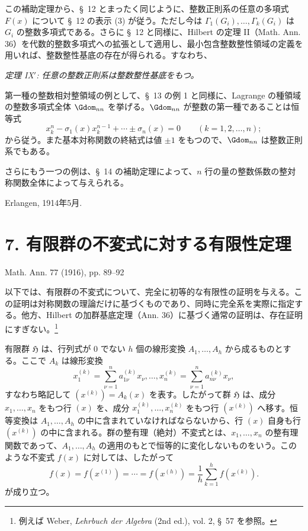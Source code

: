 \documentclass[11pt]{article}
\providecommand{\Hgrp}{\mathfrak{H}}
\begin{document}
この補助定理から、\S\ 12 とまったく同じように、整数正則系の任意の多項式 $F(x)$ について \S\ 12 の表示 (3) が従う。ただし今は $\Gamma_1(G_i),\ldots,\Gamma_k(G_i)$ は $G_i$ の整数多項式である。さらに \S\ 12 と同様に、Hilbert の定理 II（Math. Ann. 36）を代数的整数多項式への拡張として適用し、最小包含整数整性領域の定義を用いれば、整数整性基底の存在が得られる。すなわち、

\emph{定理 IX$'$: 任意の整数正則系は整数整性基底をもつ。}

第一種の整数相対整領域の例として、\S\ 13 の例 1 と同様に、Lagrange の種領域の整数多項式全体 $\Gdom_{nn}$ を挙げる。$\Gdom_{nn}$ が整数の第一種であることは恒等式
\[
  x_k^n-\sigma_1(x)x_k^{n-1}+\cdots\pm\sigma_n(x)=0
  \qquad(k=1,2,
\ldots,n);
\]
から従う。また基本対称関数の終結式は値 $\pm1$ をもつので、$\Gdom_{nn}$ は整数正則系でもある。

さらにもう一つの例は、\S\ 14 の補助定理によって、$n$ 行の量の整数係数の整対称関数全体によって与えられる。

Erlangen, 1914年5月.

\section*{7. 有限群の不変式に対する有限性定理}
\begin{center}
Math. Ann. 77 (1916), pp. 89--92
\end{center}

以下では、有限群の不変式について、完全に初等的な有限性の証明を与える。この証明は対称関数の理論だけに基づくものであり、同時に完全系を実際に指定する。他方、Hilbert の加群基底定理（Ann. 36）に基づく通常の証明は、存在証明にすぎない。\footnote{例えば Weber, \emph{Lehrbuch der Algebra} (2nd ed.), vol. 2, \S\ 57 を参照。}

有限群 $\Hgrp$ は、行列式が 0 でない $h$ 個の線形変換 $A_1,\ldots,A_h$ から成るものとする。ここで $A_k$ は線形変換
\[
  x_1^{(k)}=\sum_{\nu=1}^{n}a_{1\nu}^{(k)}x_\nu,\ldots,
  x_n^{(k)}=\sum_{\nu=1}^{n}a_{n\nu}^{(k)}x_\nu,
\]
すなわち略記して $(x^{(k)})=A_k(x)$ を表す。したがって群 $\Hgrp$ は、成分 $x_1,
\ldots,x_n$ をもつ行 $(x)$ を、成分 $x_1^{(k)},
\ldots,x_n^{(k)}$ をもつ行 $(x^{(k)})$ へ移す。恒等変換は $A_1,
\ldots,A_h$ の中に含まれていなければならないから、行 $(x)$ 自身も行 $(x^{(k)})$ の中に含まれる。群の整有理（絶対）不変式とは、$x_1,
\ldots,x_n$ の整有理関数であって、$A_1,
\ldots,A_h$ の適用のもとで恒等的に変化しないものをいう。このような不変式 $f(x)$ に対しては、したがって
\begin{equation}
  f(x)=f(x^{(1)})=\cdots=f(x^{(h)})=
  \frac1h\sum_{k=1}^{h}f(x^{(k)}).
\tag{1}
\end{equation}
が成り立つ。
\end{document}
